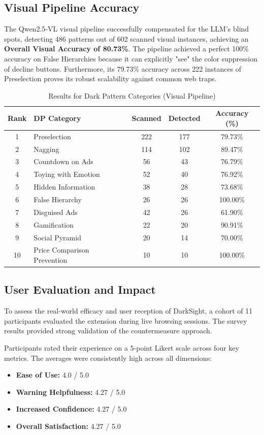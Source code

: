 \documentclass[12pt,a4paper]{article}
\begin{document}
\subsection{Visual Pipeline Accuracy}
The Qwen2.5-VL visual pipeline successfully compensated for the LLM's blind spots, detecting 486 patterns out of 602 scanned visual instances, achieving an \textbf{Overall Visual Accuracy of 80.73\%}. The pipeline achieved a perfect 100\% accuracy on False Hierarchies because it can explicitly "see" the color suppression of decline buttons. Furthermore, its 79.73\% accuracy across 222 instances of Preselection proves its robust scalability against common web traps. 

\begin{table}[H]
\centering
\caption{Results for Dark Pattern Categories (Visual Pipeline)}
\begin{tabular}{|c|l|c|c|c|}
\hline
\textbf{Rank} & \textbf{DP Category} & \textbf{Scanned} & \textbf{Detected} & \textbf{Accuracy (\%)} \\ \hline
1 & Preselection & 222 & 177 & 79.73\% \\ \hline
2 & Nagging & 114 & 102 & 89.47\% \\ \hline
3 & Countdown on Ads & 56 & 43 & 76.79\% \\ \hline
4 & Toying with Emotion & 52 & 40 & 76.92\% \\ \hline
5 & Hidden Information & 38 & 28 & 73.68\% \\ \hline
6 & False Hierarchy & 26 & 26 & 100.00\% \\ \hline
7 & Disguised Ads & 42 & 26 & 61.90\% \\ \hline
8 & Gamification & 22 & 20 & 90.91\% \\ \hline
9 & Social Pyramid & 20 & 14 & 70.00\% \\ \hline
10 & Price Comparison Prevention & 10 & 10 & 100.00\% \\ \hline
\end{tabular}
\end{table}

\subsection{User Evaluation and Impact}
To assess the real-world efficacy and user reception of DarkSight, a cohort of 11 participants evaluated the extension during live browsing sessions. The survey results provided strong validation of the countermeasure approach. 

Participants rated their experience on a 5-point Likert scale across four key metrics. The averages were consistently high across all dimensions:
\begin{itemize}
    \item \textbf{Ease of Use:} 4.0 / 5.0
    \item \textbf{Warning Helpfulness:} 4.27 / 5.0
    \item \textbf{Increased Confidence:} 4.27 / 5.0
    \item \textbf{Overall Satisfaction:} 4.27 / 5.0
\end{itemize}
\end{document}
